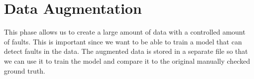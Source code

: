 \section{Data Augmentation}



This phase allows us to create a large amount of data with a controlled amount of faults. This is important since we want to be able to train a model that can detect faults in the data. The augmented data is stored in a separate file so that we can use it to train the model and compare it to the original manually checked ground truth.